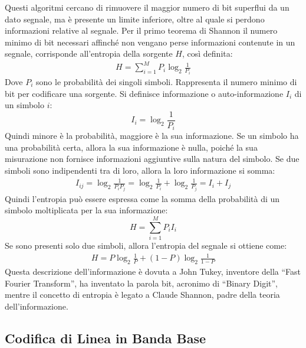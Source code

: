 \documentclass{article}
\numberwithin{equation}{subsection}
\begin{document}
Questi algoritmi cercano di rimuovere il maggior numero di bit superflui da un dato segnale, ma è presente un limite inferiore, oltre al quale si perdono informazioni 
relative al segnale. Per il primo teorema di Shannon il numero minimo di bit necessari affinché non vengano perse informazioni contenute in un segnale, corrisponde 
all'entropia della sorgente $H$, così definita:
\begin{gather}
    H=\displaystyle\sum_{i=1}^MP_i\log_2\frac{1}{P_i}
\end{gather}
Dove $P_i$ sono le probabilità dei singoli simboli. Rappresenta il numero minimo di bit per codificare una sorgente. 
Si definisce informazione o auto-informazione $I_i$ di un simbolo $i$:
\begin{equation}
    I_i=\log_2\displaystyle\frac{1}{P_i}
\end{equation}
Quindi minore è la probabilità, maggiore è la sua informazione. Se un simbolo ha una probabilità certa, allora la sua informazione è nulla, poiché la sua misurazione non 
fornisce informazioni aggiuntive sulla natura del simbolo. Se due simboli sono indipendenti tra di loro, allora la loro informazione si somma:
\begin{gather*}
    I_{ij}=\log_2\displaystyle\frac{1}{P_iP_j}=\log_2\displaystyle\frac{1}{P_i}+\log_2\displaystyle\frac{1}{P_j}=I_i+I_j
\end{gather*}
Quindi l'entropia può essere espressa come la somma della probabilità di un simbolo moltiplicata per la sua informazione:
\begin{equation}
    H=\displaystyle\sum_{i=1}^MP_iI_i
\end{equation}
Se sono presenti solo due simboli, allora l'entropia del segnale si ottiene come:
\begin{gather*}
    H=P\log_2\displaystyle\frac{1}{P}+(1-P)\log_2\frac{1}{1-P}
\end{gather*}
Questa descrizione dell'informazione è dovuta a John Tukey, inventore della ``Fast Fourier Transform'', ha inventato la parola bit, acronimo di ``Binary Digit'', 
mentre il concetto di entropia è legato a Claude Shannon, padre della teoria dell'informazione. 

\subsection{Codifica di Linea in Banda Base}
\end{document}
